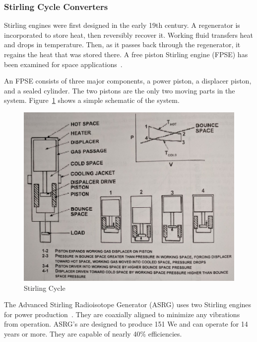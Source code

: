 \documentclass{article}
\begin{document}
\subsubsection{Stirling Cycle Converters}

Stirling engines were first designed in the early 19th century. A regenerator is incorporated to store heat, then reversibly recover it. Working fluid transfers heat and drops in temperature. Then, as it passes back through the regenerator, it regains the heat that was stored there. A free piston Stirling engine (FPSE) has been examined for space applications~\cite{goldwater1977demonstration}. 


	An FPSE consists of three major components, a power piston, a displacer piston, and a sealed cylinder. The two pistons are the only two moving parts in the system. Figure~\ref{figure4} shows a simple schematic of the system.

\begin{figure}[]
	\centering
	\includegraphics[height=0.45\textheight]{fig/figure4}
	\caption[Stirling Cycle]{Stirling Cycle~\cite{buden2011spacebook1}}
	\label{figure4}
\end{figure}


The Advanced Stirling Radioisotope Generator (ASRG) uses two Stirling engines for power production~\cite{wood2006advanced}. They are coaxially aligned to minimize any vibrations from operation. ASRG's are designed to produce 151 We and can operate for 14 years or more. They are capable of nearly 40\% efficiencies. 
\end{document}
